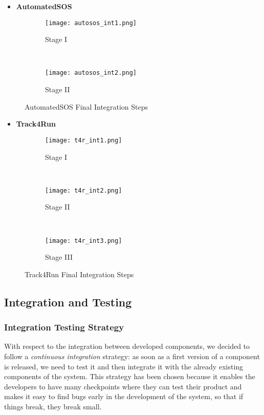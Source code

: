 \FloatBarrier
	
\begin{itemize}
	\item \textbf{AutomatedSOS}
\end{itemize}

\FloatBarrier
\begin{figure*}[ht!]	
	\centering	
	\begin{subfigure}[t]{0.5\textwidth}	
		\centering	
		\texttt{[image: autosos\_int1.png]}	
		\caption{Stage I}	
	\end{subfigure}%
	~ \vspace{20px}	
	\begin{subfigure}[t]{0.5\textwidth}	
		\centering	
		\texttt{[image: autosos\_int2.png]}	
		\caption{Stage II}	
	\end{subfigure}	
	\caption{AutomatedSOS Final Integration Steps}	
\end{figure*}	
\FloatBarrier

\begin{itemize}
	\item \textbf{Track4Run}
\end{itemize}


\FloatBarrier
\begin{figure*}[ht!]	
	\centering	
	\begin{subfigure}[t]{0.3\textwidth}	
		\centering	
		\texttt{[image: t4r\_int1.png]}	
		\caption{Stage I}	
	\end{subfigure}%
	~ \vspace{20px}	
	\begin{subfigure}[t]{0.3\textwidth}	
		\centering	
		\texttt{[image: t4r\_int2.png]}	
		\caption{Stage II}	
	\end{subfigure}
	~ \vspace{20px}
	\begin{subfigure}[t]{0.3\textwidth}	
		\centering	
		\texttt{[image: t4r\_int3.png]}	
		\caption{Stage III}	
	\end{subfigure}	
	
	\caption{Track4Run Final Integration Steps}	
\end{figure*}	
\FloatBarrier

\subsection{Integration and Testing}
\subsubsection{Integration Testing Strategy}
With respect to the integration between developed components, we decided to follow a \textit{continuous integration} strategy: as soon as a first version of a component is released, we need to test it and then integrate it with the already existing components of the system. This strategy has been chosen because it enables the developers to have many checkpoints where they can test their product and makes it easy to find bugs early in the development of the system, so that if things break, they break small.

